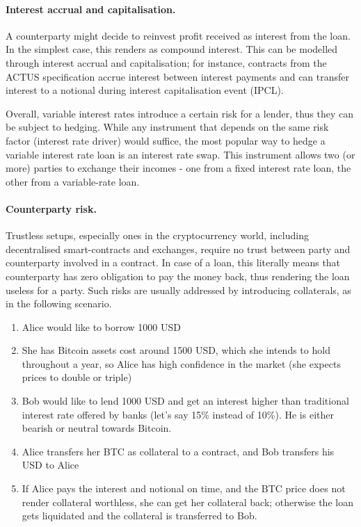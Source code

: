 \documentclass[runningheads]{llncs}
\begin{document}
\paragraph*{Interest accrual and capitalisation. }

A counterparty might decide to reinvest profit received as interest
from the %
loan. In the simplest case, this renders as compound
interest. This can be modelled through interest accrual and capitalisation;
for instance, contracts from the ACTUS specification accrue interest
between interest payments and can transfer interest to a notional
during interest capitalisation event (IPCL).

Overall, variable interest rates introduce a certain risk for a lender,
thus they can be %
subject to hedging. While any instrument that depends
on the same risk factor (interest rate driver) would suffice, the
most popular way to hedge a variable interest rate loan is an interest
rate swap. This instrument allows two (or more) parties to exchange
their incomes - one from a fixed interest rate loan, the other from a variable-rate loan.

\paragraph*{Counterparty risk.}

Trustless setups, especially ones in the cryptocurrency world, including 
decentralised smart-contracts and exchanges, require no trust between
party and counterparty involved in a contract. In case of a loan,
this literally means that counterparty has zero obligation to pay
the money back, thus rendering the loan useless for a party. Such
risks are usually addressed by introducing collaterals, as in the following scenario. 
\begin{enumerate}
\item Alice would like to borrow 1000 USD 
\item She has Bitcoin assets cost around 1500 USD, which she intends to
hold throughout a year, so Alice has high confidence in the market
(she expects prices to double or triple) 
\item Bob would like to lend 1000 USD and get an interest higher than traditional
interest rate offered by banks (let's say 15\% instead of 10\%). He
is either bearish or neutral towards Bitcoin. 
\item Alice transfers her BTC as collateral to a contract, and Bob transfers
his USD to Alice 
\item If Alice pays the interest and notional on time, and the BTC price does not
render collateral worthless, she can get her collateral back; otherwise
the loan gets liquidated and the collateral is transferred to Bob. 
\end{enumerate}
\end{document}
